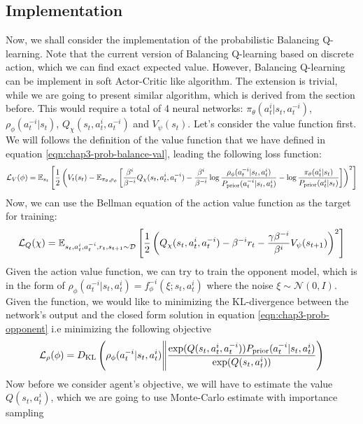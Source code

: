 \subsection{Implementation}
Now, we shall consider the implementation of the probabilistic Balancing Q-learning. Note that the current version of Balancing Q-learning based on discrete action, which we can find exact expected value. However, Balancing Q-learning can be implement in soft Actor-Critic like algorithm. The extension is trivial, while we are going to present similar algorithm, which is derived from the section before. This would require a total of 4 neural networks: $\pi_\theta(a^i_t | s_t, a^{-i}_t)$, $\rho_\phi(a^{-i}_t | s_t)$, $Q_\chi(s_t, a^i_t, a^{-i}_t)$ and $V_\psi(s_t)$. Let's consider the value function first. We will follows the definition of the value function that we have defined in equation \ref{eqn:chap3-prob-balance-val}, leading the following loss function:
\begin{equation}
    \mathcal{L}_V(\phi) = \mathbb{E}_{s_t} \left[ \frac{1}{2}\left( V_{t}(s_t) - \mathbb{E}_{\pi_\theta, \rho_\phi}\left[ \frac{\beta^{i}}{\beta^{-i}} Q_\chi(s_t, a^i_t, a^{-i}_t) - \frac{\beta^{i}}{\beta^{-i}}\log\frac{\rho_\phi(a^{-i}_t | s_t, a^i_t)}{P_{\text{prior}}( a^{-i}_t| s_t, a^i_t)} - \log \frac{\pi_\theta(a^{i}_t | s_t)}{P_{\text{prior}}(a^{i}_t | s_t)} \right]  \right)^2 \right]
\end{equation}
Now, we can use the Bellman equation of the action value function as the target for training:
\begin{equation}
    \mathcal{L}_Q(\chi) = \mathbb{E}_{s_t, a^{i}_t, a^{-i}_t, r_t, s_{t+1} \sim \mathcal{D}}\left[ \frac{1}{2}\left( Q_\chi(s_t, a^{i}_t, a^{-i}_t) - \beta^{-i} r_t - \frac{\gamma\beta^{-i}}{\beta^i}V_\psi(s_{t+1})      \right)^2 \right]
\end{equation}
Given the action value function, we can try to train the opponent model, which is in the form of $\rho_\phi(a^{-i}_t | s_t, a^i_t) = f^{-i}_\phi(\xi ; s_t, a^i_t)$ where the noise $\xi \sim \mathcal{N}(0, I)$. Given the function, we would like to minimizing the KL-divergence between the network's output and the closed form solution in equation \ref{eqn:chap3-prob-opponent} i.e minimizing the following objective 
\begin{equation}
    \mathcal{L}_\rho(\phi) = D_{\mathrm{KL}}\left( \rho_{\phi}(a^{-i}_t | s_t, a^i_t) \Bigg\| \frac{\exp(Q(s_t, a^i_t, a^{-i}_t))P_{\text{prior}}(a^{-i}_t | s_t, a^i_t)}{\exp(Q(s_t, a^{i}_t))} \right)
\end{equation}
Now before we consider agent's objective, we will have to estimate the value $Q(s_t, a^{i}_t)$, which we are going to use Monte-Carlo estimate with importance sampling 
